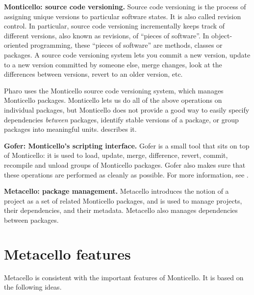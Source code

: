 \documentclass[a4paper,10pt,twoside]{book}
\begin{document}
\begin{description}

\item{\textbf{Monticello: source code versioning.}}
Source code versioning is the process of assigning unique versions to particular software states.  It is also called revision control.  
In particular, source code versioning incrementally keeps track of different versions, also known as revisions, of ``pieces of software''. 
In object-oriented programming, these ``pieces of software'' are methods, classes or packages. A source code versioning system lets you commit a new version, update to a new version committed by someone else, merge changes, look at the differences between versions,  revert to an older version, etc. 

Pharo uses the Monticello source code versioning system, which manages Monticello packages.  Monticello lets us do all of the above operations on individual packages, but Monticello does not provide a good way to easily specify dependencies \emph{between} packages, identify stable versions of a package, or group packages into meaningful units.  describes it. 

\item {\textbf{Gofer: Monticello's scripting interface.}}
Gofer is a small tool that sits on top of Monticello: it is used to load, update, merge, difference, revert, commit, recompile and unload groups of Monticello packages. Gofer also makes sure that these operations are performed as cleanly as possible. 
For more information, see .



\item{\textbf{Metacello: package management.}} Metacello introduces the notion of a project as a set of related Monticello packages, and is used to manage projects,   their dependencies, and their metadata. 
Metacello also manages dependencies between packages.
\end{description}




\section{Metacello features}

Metacello is consistent with the important features of Monticello. It is based on the following ideas.
\end{document}
